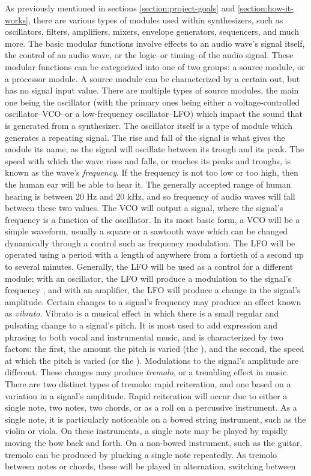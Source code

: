 As previously mentioned in sections \ref{section:project-goals} and \ref{section:how-it-works}, there are various types of modules used within synthesizers, such as oscillators, filters, amplifiers, mixers, envelope generators, sequencers, and much more. The basic modular functions involve effects to an audio wave's signal itself, the control of an audio wave, or the logic--or timing--of the audio signal\cite{Gabrielli_2020}. These modular functions can be categorized into one of two groups: a source module, or a processor module. A source module can be characterized by a certain out, but has no signal input value. There are multiple types of source modules, the main one being the oscillator (with the primary ones being either a voltage-controlled oscillator--VCO--or a low-frequency oscillator--LFO) which impact the sound that is generated from a synthesizer. The oscillator itself is a type of module which generates a repeating signal\cite{Gabrielli_2020}. The rise and fall of the signal is what gives the module its name, as the signal will oscillate between its trough and its peak\cite{Rosen_Howell_2011}. The speed with which the wave rises and falls, or reaches its peaks and troughs, is known as the wave's \textit{frequency}. If the frequency is not too low or too high, then the human ear will be able to hear it. The generally accepted range of human hearing is between 20 Hz and 20 kHz, and so frequency of audio waves will fall between these two values. The VCO will output a signal, where the signal's frequency is a function of the oscillator. In its most basic form, a VCO will be a simple waveform, usually a square or a sawtooth wave which can be changed dynamically through a control such as frequency modulation. The LFO will be operated using a period with a length of anywhere from a fortieth of a second up to several minutes. Generally, the LFO will be used as a control for a different module; with an oscillator, the LFO will produce a modulation to the signal's frequency , and with an amplifier, the LFO will produce a change in the signal's amplitude. Certain changes to a signal's frequency may produce an effect known as \textit{vibrato}. Vibrato is a musical effect in which there is a small regular and pulsating change to a signal's pitch. It is most used to add expression and phrasing to both vocal and instrumental music, and is characterized by two factors: the first, the amount the pitch is varied (the ), and the second, the speed at which the pitch is varied (or the ). Modulations to the signal's amplitude are different. These changes may produce \textit{tremolo}, or a trembling effect in music. There are two distinct types of tremolo: rapid reiteration, and one based on a variation in a signal's amplitude. Rapid reiteration will occur due to either a single note, two notes, two chords, or as a roll on a percussive instrument. As a single note, it is particularly noticeable on a bowed string instrument, such as the violin or viola. On these instruments, a single note may be played by rapidly moving the bow back and forth. On a non-bowed instrument, such as the guitar, tremolo can be produced by plucking a single note repeatedly. As tremolo between notes or chords, these will be played in alternation, switching between 